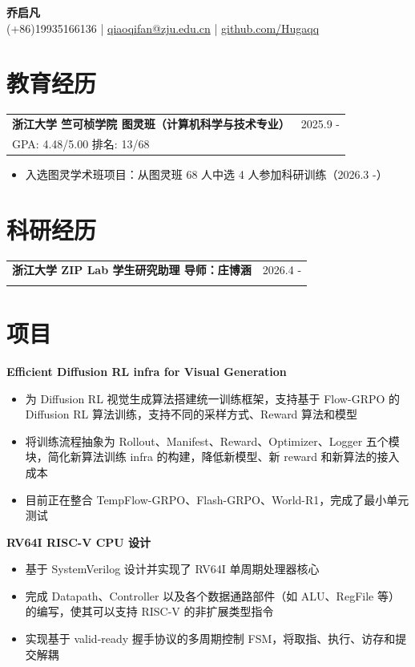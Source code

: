 \documentclass[letterpaper,12pt]{article}
\makeatletter
\newcommand{\entry}[4]{
  \begin{tabular*}{\textwidth}{l@{\extracolsep{\fill}}r}
    \textbf{#1} & #2 \\
    #3 & #4 \\
  \end{tabular*}\vspace{-3pt}
}
\newcommand{\project}[1]{
  \vspace{3pt}\textbf{#1}\vspace{-3pt}
}
\newenvironment{projectitems}{
  \begin{itemize}[
    leftmargin=1.35em,
    itemsep=3.2pt,
    topsep=3pt,
    parsep=1pt,
    partopsep=0pt
  ]
}{
  \end{itemize}
}
\makeatother
\begin{document}
\fontsize{13.5pt}{16.7pt}\selectfont

\begin{center}
  {\Huge\bfseries 乔启凡} \\ \vspace{4pt}
  \normalsize
  (+86)19935166136 \quad | \quad
  \href{mailto:qiaoqifan@zju.edu.cn}{qiaoqifan@zju.edu.cn} \quad | \quad
  \href{https://github.com/Hugaqq}{github.com/Hugaqq}
\end{center}

\section{教育经历}
\entry
  {浙江大学 竺可桢学院 图灵班（计算机科学与技术专业）}
  {2025.9 -}
  {GPA: 4.48/5.00 \textbar{} 排名: 13/68}
  {}
\begin{itemize}
  \item 入选图灵学术班项目：从图灵班 68 人中选 4 人参加科研训练（2026.3 -）
\end{itemize}

\section{科研经历}
\entry
  {浙江大学 ZIP Lab \quad 学生研究助理 \quad 导师：庄博涵}
  {2026.4 -}
  {}
  {}

\section{项目}
\project{Efficient Diffusion RL infra for Visual Generation}
\begin{projectitems}
  \item 为 Diffusion RL 视觉生成算法搭建统一训练框架，支持基于 Flow-GRPO 的 Diffusion RL 算法训练，支持不同的采样方式、Reward 算法和模型
  \item 将训练流程抽象为 Rollout、Manifest、Reward、Optimizer、Logger 五个模块，简化新算法训练 infra 的构建，降低新模型、新 reward 和新算法的接入成本
  \item 目前正在整合 TempFlow-GRPO、Flash-GRPO、World-R1，完成了最小单元测试
\end{projectitems}

\project{RV64I RISC-V CPU 设计}
\begin{projectitems}
  \item 基于 SystemVerilog 设计并实现了 RV64I 单周期处理器核心
  \item 完成 Datapath、Controller 以及各个数据通路部件（如 ALU、RegFile 等）的编写，使其可以支持 RISC-V 的非扩展类型指令
  \item 实现基于 valid-ready 握手协议的多周期控制 FSM，将取指、执行、访存和提交解耦
\end{projectitems}
\end{document}
